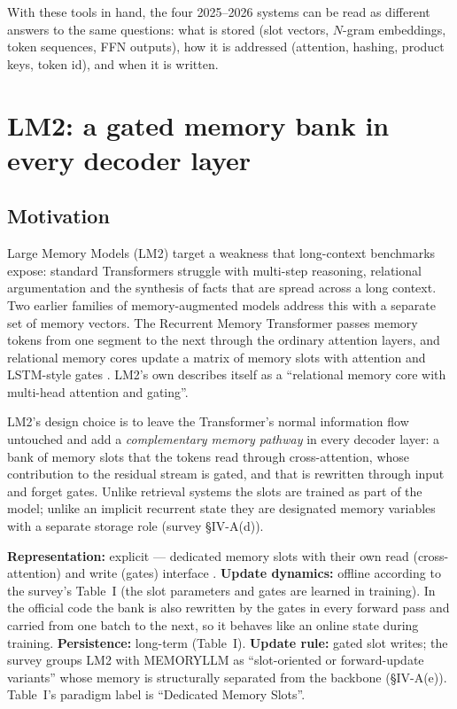 With these tools in hand, the four 2025--2026 systems can be read as different answers to the
same questions: what is stored (slot vectors, $N$-gram embeddings, token sequences, FFN outputs),
how it is addressed (attention, hashing, product keys, token id), and when it is written.

\section{LM2: a gated memory bank in every decoder layer}\label{sec:c10-lm2}

\subsection{Motivation}

Large Memory Models (LM2) \citep{kang2025lm2} target a weakness that long-context benchmarks
expose: standard Transformers struggle with multi-step reasoning, relational argumentation and the
synthesis of facts that are spread across a long context. Two earlier families of memory-augmented
models address this with a separate set of memory vectors. The Recurrent Memory Transformer
\citep{c10-bulatov2022rmt} passes memory tokens from one segment to the next through the ordinary
attention layers, and relational memory cores \citep{c10-santoro2018relational} update a matrix
of memory slots with attention and LSTM-style gates \citep{hochreiter1997lstm}. LM2's own
 describes itself as a ``relational memory core with multi-head attention and
gating''.

LM2's design choice is to leave the Transformer's normal information flow untouched and add a
\emph{complementary memory pathway} in every decoder layer: a bank of memory slots that the
tokens read through cross-attention, whose contribution to the residual stream is gated, and that
is rewritten through input and forget gates. Unlike retrieval systems the slots are trained as
part of the model; unlike an implicit recurrent state they are designated memory variables with a
separate storage role (survey \S IV-A(d)).

\begin{taxonomy}
\textbf{Representation:} explicit --- dedicated memory slots with their own read (cross-attention)
and write (gates) interface \citep[\S IV-A(d)]{zhoubian2026memory}.
\textbf{Update dynamics:} offline according to the survey's Table~I (the slot parameters and gates
are learned in training). In the official code the bank is also rewritten by the gates in every
forward pass and carried from one batch to the next, so it behaves like an online state during
training.
\textbf{Persistence:} long-term (Table~I).
\textbf{Update rule:} gated slot writes; the survey groups LM2 with MEMORYLLM as ``slot-oriented
or forward-update variants'' whose memory is structurally separated from the backbone
(\S IV-A(e)). Table~I's paradigm label is ``Dedicated Memory Slots''.
\end{taxonomy}

